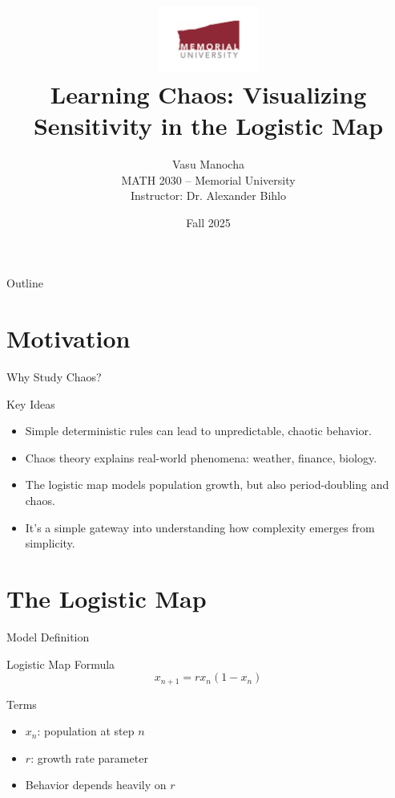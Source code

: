 \documentclass{beamer}
\title{
  \includegraphics[width=0.25\textwidth]{../logo/mun_logo.pdf}\\[1em]
  Learning Chaos: Visualizing Sensitivity in the Logistic Map
}
\author{Vasu Manocha \\
MATH 2030 – Memorial University \\
Instructor: Dr. Alexander Bihlo}
\date{Fall 2025}
\begin{document}
\begin{frame}
  \titlepage
\end{frame}

\begin{frame}{Outline}
  \tableofcontents
\end{frame}

\section{Motivation}
\begin{frame}{Why Study Chaos?}
  \begin{block}{Key Ideas}
    \begin{itemize}
      \item Simple deterministic rules can lead to unpredictable, chaotic behavior.
      \item Chaos theory explains real-world phenomena: weather, finance, biology.
      \item The logistic map models population growth, but also period-doubling and chaos.
      \item It's a simple gateway into understanding how complexity emerges from simplicity.
    \end{itemize}
  \end{block}
\end{frame}


\section{The Logistic Map}
\begin{frame}{Model Definition}
  \begin{block}{Logistic Map Formula}
    \[ x_{n+1} = r x_n (1 - x_n) \]
  \end{block}
  \begin{block}{Terms}
    \begin{itemize}
      \item $x_n$: population at step $n$
      \item $r$: growth rate parameter
      \item Behavior depends heavily on $r$
    \end{itemize}
  \end{block}
\end{frame}
\end{document}
